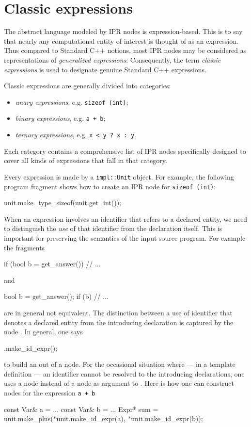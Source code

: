 \documentclass[11pt]{article}
\begin{document}
\section{Classic expressions}
\label{sec:expression}

The abstract language modeled by IPR nodes is expression-based.  This is to
say that nearly any computational entity of interest is thought of as an
expression.   Thus compared to Standard C++ notions, most IPR nodes may be
considered as representations of \emph{generalized expressions}.
Consequently, the term \emph{classic expressions} is used to designate genuine
Standard C++ expressions.

Classic expressions are generally divided into categories:
\begin{itemize}
\item \emph{unary expressions}, e.g. \texttt{sizeof (int)};
\item \emph{binary expressions}, e.g. \texttt{a + b};
\item \emph{ternary expressions}, e.g. \texttt{x < y ? x : y}.
\end{itemize}

Each category contains a comprehensive list of IPR nodes specifically designed
to cover all kinds of expressions that fall in that category.

Every expression is made by a \texttt{impl::Unit} object.  For
example, the following program fragment shows how to create an IPR node for
\texttt{sizeof (int)}:
\begin{Program}
  unit.make_type_sizeof(unit.get_int());
\end{Program}

When an expression involves an identifier that refers to a declared entity,
we need to distinguish the \emph{use} of that identifier from the declaration
itself.  This is important for preserving the semantics of the input source
program.  For example the fragments
\begin{Program}
  if (bool b = get_answer())
     // ...
\end{Program}
and
\begin{Program}
  bool b = get_answer();
  if (b)
     // ...
\end{Program}
are in general not equivalent.  The distinction between a use of
identifier that denotes a declared entity from the introducing declaration is 
captured by the node .  In general, one says
\begin{Program}
  .make_id_expr();
\end{Program}
to build an  out of a  node.  For the occasional
situation where --- in a template definition --- an identifier cannot
be resolved to the introducing declarations, one uses a  node
instead of a  node as argument to .
Here is how one can construct nodes for the expression
\texttt{a + b}
\begin{Program}
  const Var& a = ...
  const Var& b = ...
  Expr* sum = unit.make_plus(*unit.make_id_expr(a), 
                             *unit.make_id_expr(b));
\end{Program}
\end{document}
